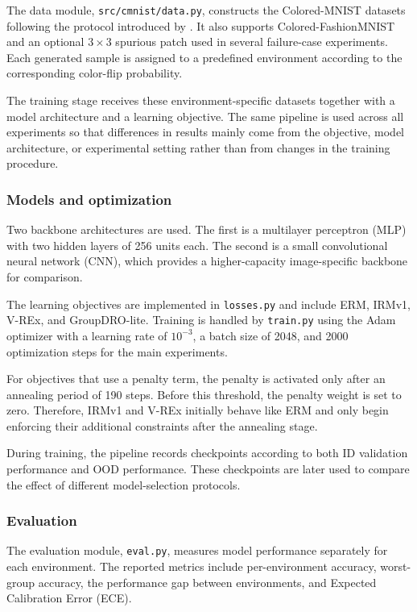 \documentclass[12pt,a4paper]{article}
\begin{document}
The data module, \texttt{src/cmnist/data.py}, constructs the Colored-MNIST datasets
following the protocol introduced by \citet{arjovsky2019irm}. It also supports
Colored-FashionMNIST and an optional $3\times3$ spurious patch used in several
failure-case experiments. Each generated sample is assigned to a predefined
environment according to the corresponding color-flip probability.

The training stage receives these environment-specific datasets together with a model
architecture and a learning objective. The same pipeline is used across all experiments
so that differences in results mainly come from the objective, model architecture,
or experimental setting rather than from changes in the training procedure.

\subsubsection{Models and optimization}
Two backbone architectures are used. The first is a multilayer perceptron (MLP) with
two hidden layers of 256 units each. The second is a small convolutional neural network
(CNN), which provides a higher-capacity image-specific backbone for comparison.

The learning objectives are implemented in \texttt{losses.py} and include ERM, IRMv1,
V-REx, and GroupDRO-lite. Training is handled by \texttt{train.py} using the Adam
optimizer with a learning rate of $10^{-3}$, a batch size of 2048, and 2000
optimization steps for the main experiments.

For objectives that use a penalty term, the penalty is activated only after an
annealing period of 190 steps. Before this threshold, the penalty weight is set to
zero. Therefore, IRMv1 and V-REx initially behave like ERM and only begin enforcing
their additional constraints after the annealing stage.

During training, the pipeline records checkpoints according to both ID validation
performance and OOD performance. These checkpoints are later used to compare the
effect of different model-selection protocols.

\subsubsection{Evaluation}
The evaluation module, \texttt{eval.py}, measures model performance separately for
each environment. The reported metrics include per-environment accuracy, worst-group
accuracy, the performance gap between environments, and Expected Calibration Error
(ECE).
\end{document}
